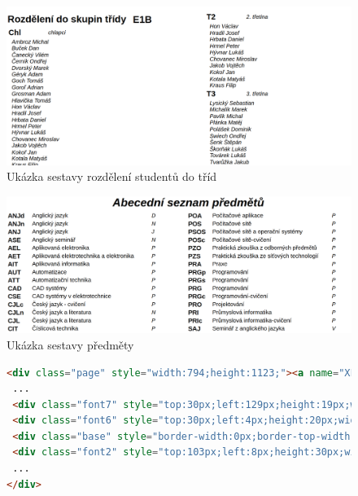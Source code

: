 \begin{figure}[H]
    \centering
    \includegraphics[width=1\linewidth]{Figures/skupiny-ukazka.png}
    \caption{Ukázka sestavy rozdělení studentů do tříd}
    \label{fig:ukazka-sestavy-tridy}

\end{figure}
\begin{figure}[H]

    \centering
    \includegraphics[width=1\linewidth]{Figures/predmety-ukazka.png}
    \caption{Ukázka sestavy předměty}
    \label{fig:ukazka-sestavy-predmety}
    
\end{figure}
\begin{figure}[H]
\begin{lstlisting}[language=HTML,caption={Zkrácené zdrojové HTML sestavy}]
<div class="page" style="width:794;height:1123;"><a name="XFRXPAGE_1">
 ...
 <div class="font7" style="top:30px;left:129px;height:19px;width:230px;...">Ing. Bos Petr</div>
 <div class="font6" style="top:30px;left:4px;height:20px;width:128px;...">Úvazek učitele:</div>
 <div class="base" style="border-width:0px;border-top-width:2px;top:80px;left:-3px;height:1px;width:756px;border-style:solid;border-color:RGB(0,0,0);background-color:RGB(0,0,0);"></div>
 <div class="font2" style="top:103px;left:8px;height:30px;width:745px;...">Balner Šimon,Blažek Matyáš,Dvorník Ondřej,Fryštacký Filip,Garel Dominik,Gořula David,Gruška Filip,Chudíček Tobiáš,Ilyenin</div>
 ...
</div>
\end{lstlisting}
\end{figure}


